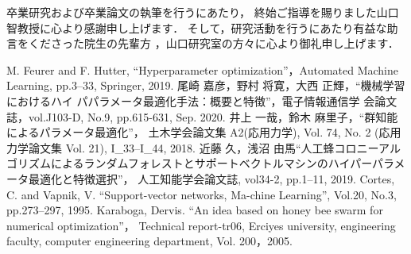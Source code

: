 \documentclass[12pt, dvipdfmx]{jarticle}
\numberwithin{equation}{section}
\begin{document}

\tableofcontents %
\clearpage %

\clearpage %
\clearpage
\clearpage
\clearpage
\clearpage
\clearpage

\clearpage
\clearpage

卒業研究および卒業論文の執筆を行うにあたり，
終始ご指導を賜りました山口智教授に心より感謝申し上げます．
そして，研究活動を行うにあたり有益な助言をくださった院生の先輩方
，山口研究室の方々に心より御礼申し上げます．
\clearpage

\begin{thebibliography}{99} %
M. Feurer and F. Hutter, “Hyperparameter optimization”，Automated Machine Learning, pp.3--33, Springer, 2019.
尾崎 嘉彦，野村 将寛，大西 正輝，“機械学習におけるハイ
パパラメータ最適化手法：概要と特徴”，電子情報通信学
会論文誌，vol.J103-D, No.9, pp.615-631, Sep. 2020.
井上 一哉，鈴木 麻里子，“群知能によるパラメータ最適化”，
土木学会論文集 A2(応用力学), Vol. 74, No. 2 (応用力学論文集 Vol. 21), I\_33--I\_44, 2018.
近藤 久，浅沼 由馬“人工蜂コロニーアルゴリズムによるランダムフォレストとサポートベクトルマシンのハイパーパラメータ最適化と特徴選択”，
人工知能学会論文誌, vol34-2, pp.1--11, 2019.
Cortes, C. and Vapnik, V. “Support-vector networks, Ma-chine Learning”, Vol.20, No.3, pp.273--297, 1995.
Karaboga, Dervis. “An idea based on honey bee swarm for numerical optimization”，
Technical report-tr06, Erciyes university, engineering faculty, computer engineering department, Vol. 200，2005.
\end{thebibliography} %
\end{document}
